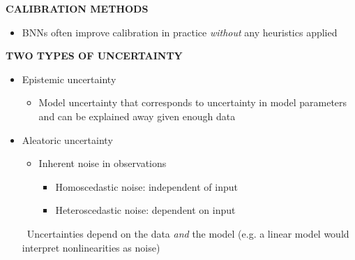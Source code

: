 \begin{whitebox}{\textbf{CALIBRATION METHODS}}
\begin{itemize}
\begin{itemize}
\begin{itemize}
\begin{align*}
                    &b=0\\
                    &a=\frac{1}{T}
                \end{align*}
                \begin{itemize}
                    \item Higher temperature $\to$ softer probabilities
                    \item Lower temperature $\to$ sharper probabilities
                \end{itemize}
            \end{itemize}
            \item BNNs often improve calibration in practice \textit{without} any heuristics applied
        \end{itemize}
    \end{itemize}
\end{whitebox}

\begin{whitebox}{\textbf{TWO TYPES OF UNCERTAINTY}}
    \begin{itemize}
        \item Epistemic uncertainty
        \begin{itemize}
            \item Model uncertainty that corresponds to uncertainty in model parameters and can be explained away given enough data
        \end{itemize}
        \item Aleatoric uncertainty
        \begin{itemize}
            \item Inherent noise in observations
            \begin{itemize}
                \item Homoscedastic noise: independent of input
                \item Heteroscedastic noise: dependent on input
            \end{itemize}
        \end{itemize}
        \faWarning\ Uncertainties depend on the data \textit{and} the model (e.g. a linear model would interpret nonlinearities as noise)
    \end{itemize}
\end{whitebox}